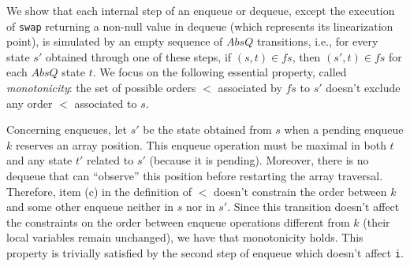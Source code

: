 We show that each internal step of an enqueue or dequeue, except the execution of {\tt swap} returning a non-null value in dequeue (which represents its linearization point), is simulated by an empty sequence of $AbsQ$ transitions, i.e., for every state $s'$ obtained through one of these steps, if $(s,t)\in\mathit{fs}$, then $(s',t)\in\mathit{fs}$ for each $AbsQ$ state $t$. We focus on the following essential property, called \emph{monotonicity}: the set of possible orders $<$ associated by $\mathit{fs}$ to $s'$ doesn't exclude any order $<$ associated to $s$.

Concerning enqueues, let $s'$ be the state obtained from $s$ when a pending enqueue $k$ reserves an array position. This enqueue operation must be maximal in both $t$ and any state $t'$ related to $s'$ (because it is pending). Moreover, there is no dequeue that can ``observe'' this position before restarting the array traversal. Therefore, item (c) in the definition of $<$ doesn't constrain the order between $k$ and some other enqueue neither in $s$ nor in $s'$. Since this transition doesn't affect the constraints on the order between enqueue operations different from $k$ (their local variables remain unchanged), we have that monotonicity holds. This property is trivially satisfied by the second step of enqueue which doesn't affect {\tt i}.

